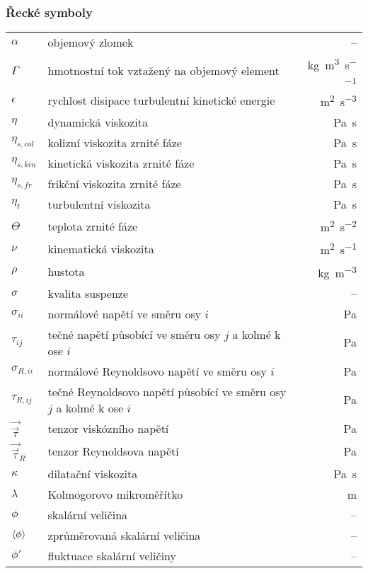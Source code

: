 \subsubsection*{Řecké symboly}
\begin{tabularx}{\textwidth}{@{}p{1.0cm} X r@{}}

$\alpha$ & objemový zlomek& --\\
$\Gamma$ & hmotnostní tok vztažený na objemový element & \si{\kilogram\per\cubic\meter\per\second} \\ 
$\epsilon$ & rychlost disipace turbulentní kinetické energie & \si{\meter\squared\per\second\cubed}\\
$\eta$ & dynamická viskozita & \si{\pascal\second}\\
$\eta_{s,col}$ & kolizní viskozita zrnité fáze & \si{\pascal\second}\\
$\eta_{s,kin}$ & kinetická viskozita zrnité fáze & \si{\pascal\second}\\
$\eta_{s,fr}$ & frikční viskozita zrnité fáze & \si{\pascal\second}\\
$\eta_{t}$ & turbulentní viskozita & \si{\pascal\second}\\
$\Theta$ & teplota zrnité fáze & \si{\meter\squared\per\second\squared} \\
$\nu$ & kinematická viskozita & \si{\meter\squared\per\second}\\
$\rho$ & hustota & \si{\kilogram\per\cubic\meter} \\
$\sigma$ & kvalita suspenze & -- \\
$\sigma_{ii}$ & normálové napětí ve směru osy $i$ & \si{\pascal} \\
$\tau_{ij}$ & tečné napětí působící ve směru osy $j$ a kolmé k ose $i$ & \si{\pascal} \\
$\sigma_{R,ii}$ & normálové Reynoldsovo napětí ve směru osy $i$ & \si{\pascal} \\
$\tau_{R,ij}$ & tečné Reynoldsovo napětí působící ve směru osy $j$ a kolmé k ose $i$ & \si{\pascal} \\
$\vec{\vec{\tau}}$ & tenzor viskózního napětí & \si{\pascal} \\
$\vec{\vec{\tau}}_{R}$ & tenzor Reynoldsova napětí & \si{\pascal} \\
$\kappa$ & dilatační viskozita & \si{\pascal\second}\\
$\lambda$ & Kolmogorovo mikroměřítko & \si{\meter}\\
$\phi$ & skalární veličina & --\\
$\left< \phi \right>$ & zprůměrovaná skalární veličina & --\\
$\phi'$ & fluktuace skalární veličiny & --\\

\end{tabularx}

